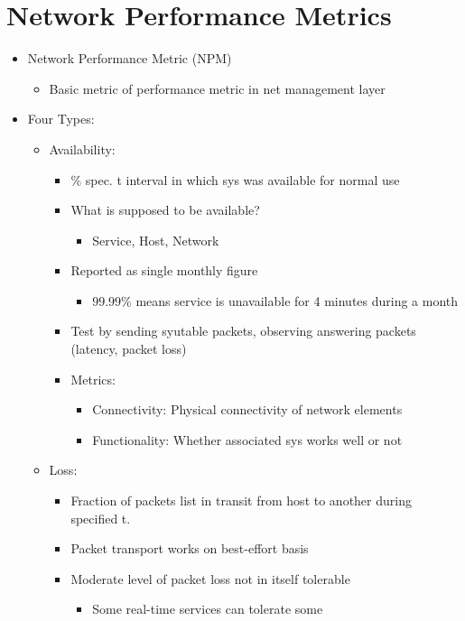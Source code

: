 \section{Network Performance Metrics}
\begin{itemize}
	\item Network Performance Metric (NPM)
	\begin{itemize}
		\item Basic metric of performance metric in net management layer
	\end{itemize}
	\item Four Types:
	\begin{itemize}
		\item Availability:
		\begin{itemize}
			\item $\%$ spec. t interval in which sys was available
				for normal use
			\item What is supposed to be available?
			\begin{itemize}
				\item Service, Host, Network
			\end{itemize}
			\item Reported as single monthly figure
			\begin{itemize}
				\item $99.99\%$ means service is unavailable for
					4 minutes during a month
			\end{itemize}
			\item Test by sending syutable packets, observing
				answering packets (latency, packet loss)
			\item Metrics:
			\begin{itemize}
				\item Connectivity: Physical connectivity of
					network elements
				\item Functionality: Whether associated sys
					works well or not
			\end{itemize}
		\end{itemize}
		\item Loss:
		\begin{itemize}
			\item Fraction of packets list in transit from host to
				another during specified t.
			\item Packet transport works on best-effort basis
			\item Moderate level of packet loss not in itself
				tolerable
			\begin{itemize}
				\item Some real-time services can tolerate some

\end{itemize}
\end{itemize}
\end{itemize}
\end{itemize}
